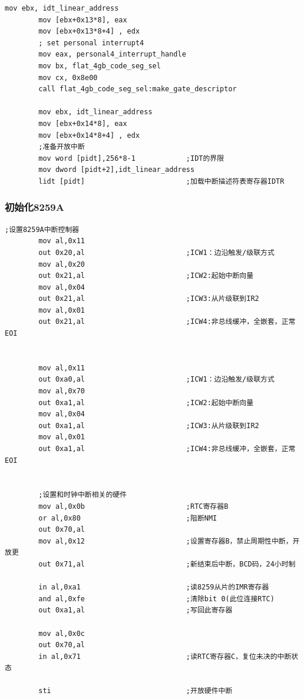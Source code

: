\documentclass[a4paper,11pt,UTF8]{ctexart}
\begin{document}
\begin{lstlisting}[caption={安装 IDT},tabsize=4,basicstyle=\footnotesize,captionpos=b]
		mov ebx, idt_linear_address
		mov [ebx+0x13*8], eax
		mov [ebx+0x13*8+4] , edx
		; set personal interrupt4
		mov eax, personal4_interrupt_handle
		mov bx, flat_4gb_code_seg_sel
		mov cx, 0x8e00
		call flat_4gb_code_seg_sel:make_gate_descriptor

		mov ebx, idt_linear_address
		mov [ebx+0x14*8], eax
		mov [ebx+0x14*8+4] , edx
		;准备开放中断
		mov word [pidt],256*8-1            ;IDT的界限
		mov dword [pidt+2],idt_linear_address
		lidt [pidt]                        ;加载中断描述符表寄存器IDTR

	\end{lstlisting}

		\subsubsection{初始化8259A}
	\begin{lstlisting}[caption={初始化8259A},tabsize=4,basicstyle=\footnotesize,captionpos=b]
		;设置8259A中断控制器
		mov al,0x11
		out 0x20,al                        ;ICW1：边沿触发/级联方式
		mov al,0x20
		out 0x21,al                        ;ICW2:起始中断向量
		mov al,0x04
		out 0x21,al                        ;ICW3:从片级联到IR2
		mov al,0x01
		out 0x21,al                        ;ICW4:非总线缓冲，全嵌套，正常EOI


		mov al,0x11
		out 0xa0,al                        ;ICW1：边沿触发/级联方式
		mov al,0x70
		out 0xa1,al                        ;ICW2:起始中断向量
		mov al,0x04
		out 0xa1,al                        ;ICW3:从片级联到IR2
		mov al,0x01
		out 0xa1,al                        ;ICW4:非总线缓冲，全嵌套，正常EOI


		;设置和时钟中断相关的硬件 
		mov al,0x0b                        ;RTC寄存器B
		or al,0x80                         ;阻断NMI
		out 0x70,al
		mov al,0x12                        ;设置寄存器B，禁止周期性中断，开放更
		out 0x71,al                        ;新结束后中断，BCD码，24小时制

		in al,0xa1                         ;读8259从片的IMR寄存器
		and al,0xfe                        ;清除bit 0(此位连接RTC)
		out 0xa1,al                        ;写回此寄存器

		mov al,0x0c
		out 0x70,al
		in al,0x71                         ;读RTC寄存器C，复位未决的中断状态

		sti                                ;开放硬件中断

	\end{lstlisting}
\end{document}
